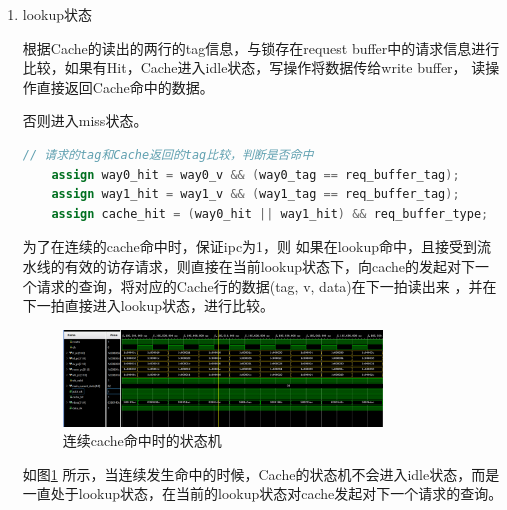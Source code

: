 \documentclass[11pt]{article}
\begin{document}
\begin{enumerate}
\begin{enumerate}
            并且，在request buffer中存储请求的相关信息。

\begin{lstlisting}[language=verilog]
// requeset buffer，存储接受到的请求信息
always @(posedge clk)begin
    if(~resetn) begin
        req_buffer_op <=       1'b0;
        req_buffer_index <=    8'b0;
        req_buffer_tag <=      20'b0;
        req_buffer_offset <=   4'b0;
        req_buffer_wstrb <=    4'b0;
        req_buffer_wdata <=    32'b0;
        req_buffer_type  =     1'b0;
    end
    else if(addr_ok & valid)begin      // next_state == LOOKUP，存储请求信息
        req_buffer_op <=       op;
        req_buffer_index <=    index;
        req_buffer_tag <=      tag;
        req_buffer_offset <=   offset;
        req_buffer_wstrb <=    wstrb;
        req_buffer_wdata <=    wdata;
        req_buffer_type  <=    type;       
    end
end
\end{lstlisting}
\item lookup状态

根据Cache的读出的两行的tag信息，与锁存在request buffer中的请求信息进行比较，如果有Hit，Cache进入idle状态，写操作将数据传给write buffer，
读操作直接返回Cache命中的数据。

否则进入miss状态。
\begin{lstlisting}[language=verilog]
// 请求的tag和Cache返回的tag比较，判断是否命中
    assign way0_hit = way0_v && (way0_tag == req_buffer_tag);
    assign way1_hit = way1_v && (way1_tag == req_buffer_tag);
    assign cache_hit = (way0_hit || way1_hit) && req_buffer_type;
\end{lstlisting}
为了在连续的cache命中时，保证ipc为1，则
如果在lookup命中，且接受到流水线的有效的访存请求，则直接在当前lookup状态下，向cache的发起对下一个请求的查询，将对应的Cache行的数据(tag, v, data)在下一拍读出来
，并在下一拍直接进入lookup状态，进行比较。

\begin{figure}[H]
    \centering
    \includegraphics[width=0.8\textwidth]{fig/fig4.png}
    \caption{连续cache命中时的状态机}
    \label{fig:4}
\end{figure}
如图\ref{fig:4}
所示，当连续发生命中的时候，Cache的状态机不会进入idle状态，而是一直处于lookup状态，在当前的lookup状态对cache发起对下一个请求的查询。


\end{enumerate}
\end{enumerate}
\end{document}
